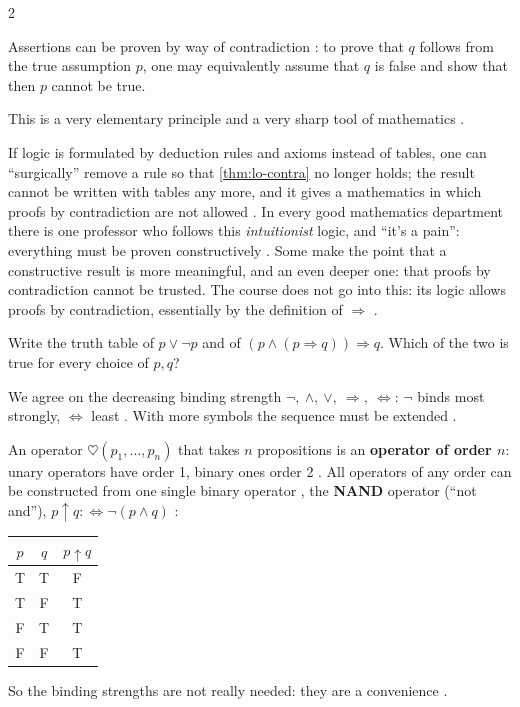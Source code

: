 \begin{paracol}{2}
\begin{corollary}\label{cor:lo-contradiction}
Assertions can be proven by way of contradiction : to prove that $q$ follows from the true
assumption $p$, one may equivalently assume that $q$ is false and show that then $p$ cannot be true.
\end{corollary}
This is a very elementary principle and a very sharp tool of mathematics .

\begin{secondary}
If logic is formulated by deduction rules and axioms instead of tables, one can ``surgically'' remove a rule
so that \cref{thm:lo-contra} no longer holds; the result cannot be written with tables any more, and it gives a
mathematics in which proofs by contradiction are not allowed . In every good mathematics
department there is one professor who follows this \emph{intuitionist} logic, and ``it's a pain'': everything
must be proven constructively . Some make the point that a constructive result is more
meaningful, and an even deeper one: that proofs by contradiction cannot be trusted. The course does not go into
this: its logic allows proofs by contradiction, essentially by the definition of $\Rightarrow$
.
\end{secondary}

\begin{exercise}[A tautology]\label{ex:lo-taut}
Write the truth table of $p\vee\neg p$ and of $(p\wedge(p\Rightarrow q))\Rightarrow q$. Which of the two is
true for every choice of $p,q$?
\end{exercise}

\begin{remark}\label{rem:lo-binding}
We agree on the decreasing binding strength $\neg,\ \wedge,\ \vee,\ \Rightarrow,\ \Leftrightarrow$: $\neg$ binds
most strongly, $\Leftrightarrow$ least . With more symbols the sequence must be extended
.
\end{remark}

\begin{remark}\label{rem:lo-nand}
An operator $\heartsuit(p_1,\dots,p_n)$ that takes $n$ propositions is an \textbf{operator of order $n$}: unary
operators have order 1, binary ones order 2 . All operators of any order can be constructed from
one single binary operator , the \textbf{NAND} operator (``not and''), $p\uparrow q:\Leftrightarrow
\neg(p\wedge q)$ :
\begin{center}
\renewcommand{\arraystretch}{1.35}
\begin{tabular}{cc|c}
$p$ & $q$ & $p\uparrow q$\\\hline
T&T&F\\ T&F&T\\ F&T&T\\ F&F&T
\end{tabular}
\end{center}
So the binding strengths are not really needed: they are a convenience .
\end{remark}


\end{paracol}
